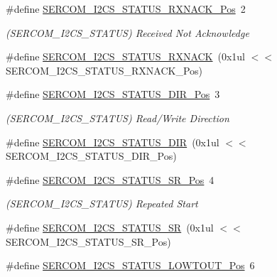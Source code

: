\begin{DoxyCompactItemize}
\item 
\#define \mbox{\hyperlink{group___s_a_m_d21___s_e_r_c_o_m_ga95cafce100483170a0abde961ffae973}{S\+E\+R\+C\+O\+M\+\_\+\+I2\+C\+S\+\_\+\+S\+T\+A\+T\+U\+S\+\_\+\+R\+X\+N\+A\+C\+K\+\_\+\+Pos}}~2
\begin{DoxyCompactList}\small\item\em (S\+E\+R\+C\+O\+M\+\_\+\+I2\+C\+S\+\_\+\+S\+T\+A\+T\+US) Received Not Acknowledge \end{DoxyCompactList}\item 
\#define \mbox{\hyperlink{group___s_a_m_d21___s_e_r_c_o_m_ga99dd1f2ffc17db0ad85bd6fa75786a1a}{S\+E\+R\+C\+O\+M\+\_\+\+I2\+C\+S\+\_\+\+S\+T\+A\+T\+U\+S\+\_\+\+R\+X\+N\+A\+CK}}~(0x1ul $<$$<$ S\+E\+R\+C\+O\+M\+\_\+\+I2\+C\+S\+\_\+\+S\+T\+A\+T\+U\+S\+\_\+\+R\+X\+N\+A\+C\+K\+\_\+\+Pos)
\item 
\#define \mbox{\hyperlink{group___s_a_m_d21___s_e_r_c_o_m_ga1a1443388e0f74338aa35f8e4cfa4665}{S\+E\+R\+C\+O\+M\+\_\+\+I2\+C\+S\+\_\+\+S\+T\+A\+T\+U\+S\+\_\+\+D\+I\+R\+\_\+\+Pos}}~3
\begin{DoxyCompactList}\small\item\em (S\+E\+R\+C\+O\+M\+\_\+\+I2\+C\+S\+\_\+\+S\+T\+A\+T\+US) Read/\+Write Direction \end{DoxyCompactList}\item 
\#define \mbox{\hyperlink{group___s_a_m_d21___s_e_r_c_o_m_gafa1b39cd69568762170e373892714628}{S\+E\+R\+C\+O\+M\+\_\+\+I2\+C\+S\+\_\+\+S\+T\+A\+T\+U\+S\+\_\+\+D\+IR}}~(0x1ul $<$$<$ S\+E\+R\+C\+O\+M\+\_\+\+I2\+C\+S\+\_\+\+S\+T\+A\+T\+U\+S\+\_\+\+D\+I\+R\+\_\+\+Pos)
\item 
\#define \mbox{\hyperlink{group___s_a_m_d21___s_e_r_c_o_m_ga69162462f8ab1b129dda7cf794adeb2f}{S\+E\+R\+C\+O\+M\+\_\+\+I2\+C\+S\+\_\+\+S\+T\+A\+T\+U\+S\+\_\+\+S\+R\+\_\+\+Pos}}~4
\begin{DoxyCompactList}\small\item\em (S\+E\+R\+C\+O\+M\+\_\+\+I2\+C\+S\+\_\+\+S\+T\+A\+T\+US) Repeated Start \end{DoxyCompactList}\item 
\#define \mbox{\hyperlink{group___s_a_m_d21___s_e_r_c_o_m_ga4722f6fa7a3d5e44f3b02bcdae64beb9}{S\+E\+R\+C\+O\+M\+\_\+\+I2\+C\+S\+\_\+\+S\+T\+A\+T\+U\+S\+\_\+\+SR}}~(0x1ul $<$$<$ S\+E\+R\+C\+O\+M\+\_\+\+I2\+C\+S\+\_\+\+S\+T\+A\+T\+U\+S\+\_\+\+S\+R\+\_\+\+Pos)
\item 
\#define \mbox{\hyperlink{group___s_a_m_d21___s_e_r_c_o_m_ga11dcbc9f9772e3b104206fc81284de1b}{S\+E\+R\+C\+O\+M\+\_\+\+I2\+C\+S\+\_\+\+S\+T\+A\+T\+U\+S\+\_\+\+L\+O\+W\+T\+O\+U\+T\+\_\+\+Pos}}~6
$$
\end{DoxyCompactItemize}
